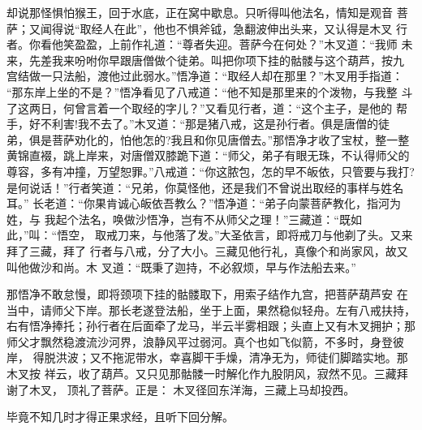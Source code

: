 却说那怪惧怕猴王，回于水底，正在窝中歇息。只听得叫他法名，情知是观音
菩萨；又闻得说“取经人在此”，他也不惧斧钺，急翻波伸出头来，又认得是木叉
行者。你看他笑盈盈，上前作礼道：“尊者失迎。菩萨今在何处？”木叉道：“我师
未来，先差我来吩咐你早跟唐僧做个徒弟。叫把你项下挂的骷髅与这个葫芦，按九
宫结做一只法船，渡他过此弱水。”悟净道：“取经人却在那里？”木叉用手指道：
“那东岸上坐的不是？”悟净看见了八戒道：“他不知是那里来的个泼物，与我整
斗了这两日，何曾言着一个取经的字儿？”又看见行者，道：“这个主子，是他的
帮手，好不利害!我不去了。”木叉道：“那是猪八戒，这是孙行者。俱是唐僧的徒
弟，俱是菩萨劝化的，怕他怎的?我且和你见唐僧去。”那悟净才收了宝杖，整一整
黄锦直裰，跳上岸来，对唐僧双膝跪下道：“师父，弟子有眼无珠，不认得师父的
尊容，多有冲撞，万望恕罪。”八戒道：“你这脓包，怎的早不皈依，只管要与我打?
是何说话！”行者笑道：“兄弟，你莫怪他，还是我们不曾说出取经的事样与姓名耳。”
长老道：“你果肯诚心皈依吾教么？”悟净道：“弟子向蒙菩萨教化，指河为姓，与
我起个法名，唤做沙悟净，岂有不从师父之理！”三藏道：“既如此，”叫：“悟空，
取戒刀来，与他落了发。”大圣依言，即将戒刀与他剃了头。又来拜了三藏，拜了
行者与八戒，分了大小。三藏见他行礼，真像个和尚家风，故又叫他做沙和尚。木
叉道：“既秉了迦持，不必叙烦，早与作法船去来。”

那悟净不敢怠慢，即将颈项下挂的骷髅取下，用索子结作九宫，把菩萨葫芦安
在当中，请师父下岸。那长老遂登法船，坐于上面，果然稳似轻舟。左有八戒扶持，
右有悟净捧托；孙行者在后面牵了龙马，半云半雾相跟；头直上又有木叉拥护；那
师父才飘然稳渡流沙河界，浪静风平过弱河。真个也如飞似箭，不多时，身登彼岸，
得脱洪波；又不拖泥带水，幸喜脚干手燥，清净无为，师徒们脚踏实地。那木叉按
祥云，收了葫芦。又只见那骷髅一时解化作九股阴风，寂然不见。三藏拜谢了木叉，
顶礼了菩萨。正是：
木叉径回东洋海，三藏上马却投西。

毕竟不知几时才得正果求经，且听下回分解。